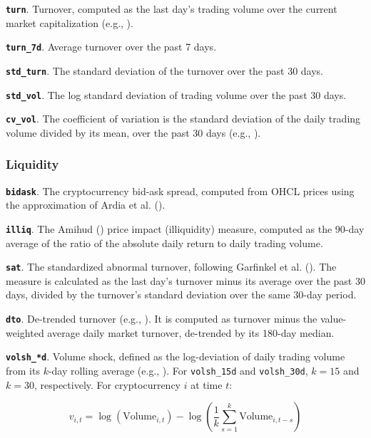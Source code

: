 \documentclass[
  12pt,
  a4paper,
  openany]{scrbook}
\begin{document}
\textbf{\texttt{turn}}. Turnover, computed as the last day's trading
volume over the current market capitalization (e.g.,
).

\textbf{\texttt{turn\_7d}}. Average turnover over the past 7 days.

\textbf{\texttt{std\_turn}}. The standard deviation of the turnover over
the past 30 days.

\textbf{\texttt{std\_vol}}. The log standard deviation of trading volume
over the past 30 days.

\textbf{\texttt{cv\_vol}}. The coefficient of variation is the standard
deviation of the daily trading volume divided by its mean, over the past
30 days (e.g., ).

\subsubsection{Liquidity}\label{liquidity}

\textbf{\texttt{bidask}}. The cryptocurrency bid-ask spread, computed
from OHCL prices using the approximation of Ardia et al.
().

\textbf{\texttt{illiq}}. The Amihud
() price impact
(illiquidity) measure, computed as the 90-day average of the ratio of
the absolute daily return to daily trading volume.

\textbf{\texttt{sat}}. The standardized abnormal turnover, following
Garfinkel et al. ().
The measure is calculated as the last day's turnover minus its average
over the past 30 days, divided by the turnover's standard deviation over
the same 30-day period.

\textbf{\texttt{dto}}. De-trended turnover (e.g.,
). It is
computed as turnover minus the value-weighted average daily market
turnover, de-trended by its 180-day median.

\textbf{\texttt{volsh\_*d}}. Volume shock, defined as the log-deviation
of daily trading volume from its \(k\)-day rolling average (e.g.,
).
For \texttt{volsh\_15d} and \texttt{volsh\_30d}, \(k = 15\) and
\(k = 30\), respectively. For cryptocurrency \(i\) at time \(t\):

\[
v_{i,t} = \log(\text{Volume}_{i,t}) - \log\left( \frac{1}{k} \sum_{s=1}^{k} \text{Volume}_{i,t-s} \right)
\]
\end{document}
